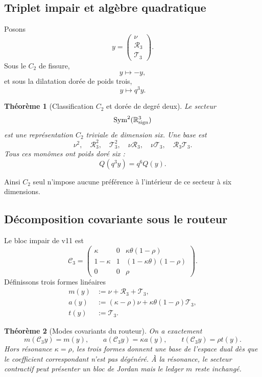 \documentclass[11pt,a4paper]{article}
\newtheorem{theorem}{Théorème}[section]
\begin{document}
\subsection{Triplet impair et algèbre quadratique}

Posons
\[
 y=
 \begin{pmatrix}
 \nu\\ \mathscr R_3\\ \mathscr T_3
 \end{pmatrix}.
\]
Sous le $C_2$ de fissure,
\[
 y\longmapsto-y,
\]
et sous la dilatation dorée de poids trois,
\[
 y\longmapsto q^3y.
\]

\begin{theorem}[Classification $C_2$ et dorée de degré deux]\label{thm:v20-six-quadratics}
Le secteur
\[
 \operatorname{Sym}^2(\mathbb R^3_{\rm sign})
\]
est une représentation $C_2$ triviale de dimension six. Une base est
\[
 \boxed{
 \nu^2,\quad
 \mathscr R_3^2,\quad
 \mathscr T_3^2,\quad
 \nu\mathscr R_3,\quad
 \nu\mathscr T_3,\quad
 \mathscr R_3\mathscr T_3.}
\]
Tous ces monômes ont poids doré six :
\[
 Q(q^3y)=q^6Q(y).
\]
\end{theorem}

Ainsi $C_2$ seul n'impose aucune préférence à l'intérieur de ce secteur à six dimensions.

\subsection{Décomposition covariante sous le routeur}

Le bloc impair de v11 est
\[
 \mathcal C_3=
 \begin{pmatrix}
 \kappa&0&\kappa\theta(1-\rho)\\
 1-\kappa&1&(1-\kappa\theta)(1-\rho)\\
 0&0&\rho
 \end{pmatrix}.
\]
Définissons trois formes linéaires
\[
 \boxed{
 \begin{aligned}
 m(y)&:=\nu+\mathscr R_3+\mathscr T_3,\\
 a(y)&:=(\kappa-\rho)\nu+\kappa\theta(1-\rho)\mathscr T_3,\\
 t(y)&:=\mathscr T_3.
 \end{aligned}}
\]

\begin{theorem}[Modes covariants du routeur]\label{thm:v20-router-modes}
On a exactement
\[
 \boxed{
 m(\mathcal C_3y)=m(y),\qquad
 a(\mathcal C_3y)=\kappa a(y),\qquad
 t(\mathcal C_3y)=\rho t(y).}
\]
Hors résonance $\kappa=\rho$, les trois formes donnent une base de l'espace dual dès que le coefficient correspondant n'est pas dégénéré. À la résonance, le secteur contractif peut présenter un bloc de Jordan mais le ledger $m$ reste inchangé.
\end{theorem}
\end{document}
